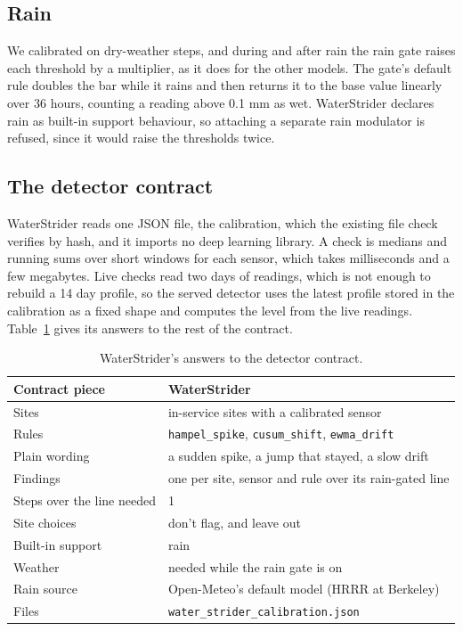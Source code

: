 \documentclass{article}
\begin{document}
\subsection{Rain}
\label{sec:rain}

We calibrated on dry-weather steps, and during and after rain the rain gate
raises each threshold by a multiplier, as it does for the other models. The
gate's default rule doubles the bar while it rains and then returns it to the
base value linearly over 36 hours, counting a reading above 0.1 mm as wet.
WaterStrider declares rain as built-in support behaviour, so attaching a
separate rain modulator is refused, since it would raise the thresholds twice.

\subsection{The detector contract}
\label{sec:contract}

WaterStrider reads one JSON file, the calibration, which the existing file
check verifies by hash, and it imports no deep learning library. A check is
medians and running sums over short windows for each sensor, which takes
milliseconds and a few megabytes. Live checks read two days of readings, which
is not enough to rebuild a 14 day profile, so the served detector uses the
latest profile stored in the calibration as a fixed shape and computes the
level from the live readings. Table~\ref{tab:contract} gives its answers to the
rest of the contract.

\begin{table}[t]
  \centering
  \caption{WaterStrider's answers to the detector contract.}
  \label{tab:contract}
  \begin{tabular}{ll}
    \toprule
    Contract piece & WaterStrider \\
    \midrule
    Sites & in-service sites with a calibrated sensor \\
    Rules & \texttt{hampel\_spike}, \texttt{cusum\_shift}, \texttt{ewma\_drift} \\
    Plain wording & a sudden spike, a jump that stayed, a slow drift \\
    Findings & one per site, sensor and rule over its rain-gated line \\
    Steps over the line needed & 1 \\
    Site choices & don't flag, and leave out \\
    Built-in support & rain \\
    Weather & needed while the rain gate is on \\
    Rain source & Open-Meteo's default model (HRRR at Berkeley) \\
    Files & \texttt{water\_strider\_calibration.json} \\
    \bottomrule
  \end{tabular}
\end{table}
\end{document}
